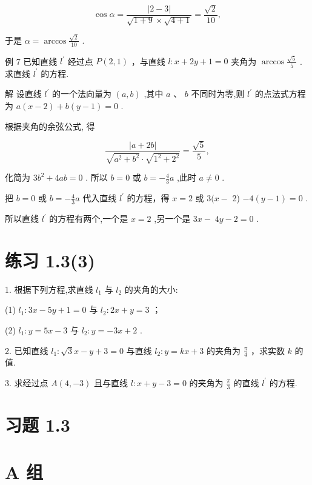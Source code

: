 \documentclass[10pt]{article}
\begin{document}
\[
\cos \alpha  = \frac{\left| 2 - 3\right| }{\sqrt{1 + 9} \times  \sqrt{4 + 1}} = \frac{\sqrt{2}}{10},
\]

于是 \(\alpha  = \arccos \frac{\sqrt{2}}{10}\) .

例 7 已知直线 \({l}^{\prime }\) 经过点 \(P\left( {2,1}\right)\) ，与直线 \(l : x + {2y} + 1 = 0\) 夹角为 \(\arccos \frac{\sqrt{5}}{5}\) . 求直线 \({l}^{\prime }\) 的方程.

解 设直线 \({l}^{\prime }\) 的一个法向量为 \(\left( {a,b}\right)\) ,其中 \(a\text{ 、 }b\) 不同时为零,则 \({l}^{\prime }\) 的点法式方程为 \(a\left( {x - 2}\right)  + b\left( {y - 1}\right)  = 0\) .

根据夹角的余弦公式, 得

\[
\frac{\left| a + 2b\right| }{\sqrt{{a}^{2} + {b}^{2}} \cdot  \sqrt{{1}^{2} + {2}^{2}}} = \frac{\sqrt{5}}{5},
\]

化简为 \(3{b}^{2} + {4ab} = 0\) . 所以 \(b = 0\) 或 \(b =  - \frac{4}{3}a\) ,此时 \(a \neq  0\) .

把 \(b = 0\) 或 \(b =  - \frac{4}{3}a\) 代入直线 \({l}^{\prime }\) 的方程，得 \(x = 2\) 或 \(3(x -\) 2) \(- 4\left( {y - 1}\right)  = 0\) .

所以直线 \({l}^{\prime }\) 的方程有两个,一个是 \(x = 2\) ,另一个是 \({3x} - \; {4y} - 2 = 0\) .

\section*{练习 1.3(3)}

1. 根据下列方程,求直线 \({l}_{1}\) 与 \({l}_{2}\) 的夹角的大小:

(1) \({l}_{1} : {3x} - {5y} + 1 = 0\) 与 \({l}_{2} : {2x} + y = 3\) ；

(2) \({l}_{1} : {y = {5x} - 3}\) 与 \({l}_{2} : {y =  - {3x} + 2}\) .

2. 已知直线 \({l}_{1} : \sqrt{3}x - y + 3 = 0\) 与直线 \({l}_{2} : y = {kx} + 3\) 的夹角为 \(\frac{\pi }{4}\) ，求实数 \(k\) 的值.

3. 求经过点 \(A\left( {4, - 3}\right)\) 且与直线 \(l : x + y - 3 = 0\) 的夹角为 \(\frac{\pi }{3}\) 的直线 \({l}^{\prime }\) 的方程.

\section*{习题 1.3}

\section*{A 组}
\end{document}
